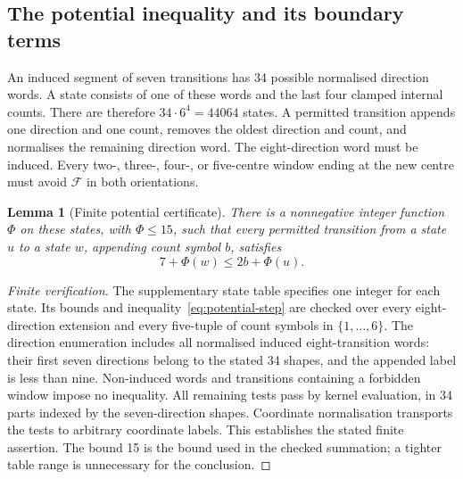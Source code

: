 \documentclass[11pt,a4paper]{article}
\newtheorem{lemma}[theorem]{Lemma}
\theoremstyle{definition}
\theoremstyle{remark}
\begin{document}
\subsection{The potential inequality and its boundary terms}
An induced segment of seven transitions has 34 possible normalised direction words. A state consists of one of these words and the last four clamped internal counts. There are therefore $34\cdot6^4=44064$ states. A permitted transition appends one direction and one count, removes the oldest direction and count, and normalises the remaining direction word. The eight-direction word must be induced. Every two-, three-, four-, or five-centre window ending at the new centre must avoid $\mathcal F$ in both orientations.

\begin{lemma}[Finite potential certificate]\label{lem:potential-certificate}
There is a nonnegative integer function $\Phi$ on these states, with $\Phi\le15$, such that every permitted transition from a state $u$ to a state $w$, appending count symbol $b$, satisfies
\begin{equation}\label{eq:potential-step}
7+\Phi(w)\le2b+\Phi(u).
\end{equation}
\end{lemma}
\begin{proof}[Finite verification]
The supplementary state table specifies one integer for each state. Its bounds and inequality~\eqref{eq:potential-step} are checked over every eight-direction extension and every five-tuple of count symbols in $\{1,\ldots,6\}$. The direction enumeration includes all normalised induced eight-transition words: their first seven directions belong to the stated 34 shapes, and the appended label is less than nine. Non-induced words and transitions containing a forbidden window impose no inequality. All remaining tests pass by kernel evaluation, in 34 parts indexed by the seven-direction shapes. Coordinate normalisation transports the tests to arbitrary coordinate labels. This establishes the stated finite assertion. The bound 15 is the bound used in the checked summation; a tighter table range is unnecessary for the conclusion.
\end{proof}
\end{document}

